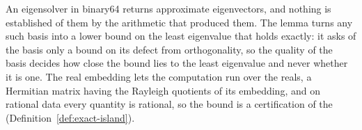 
An eigensolver in binary64 returns approximate eigenvectors, and nothing is
established of them by the arithmetic that produced them. The lemma turns any
such basis into a lower bound on the least eigenvalue that holds exactly: it
asks of the basis only a bound on its defect from orthogonality, so the
quality of the basis decides how close the bound lies to the least eigenvalue
and never whether it is one. The real embedding lets the computation run over
the reals, a Hermitian matrix having the Rayleigh quotients of its embedding,
and on rational data every quantity is rational, so the bound is a
certification of the  (Definition~\ref{def:exact-island}).

